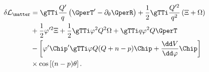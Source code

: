 \begin{equation}
\begin{aligned}
\delta \mathcal{L}_\matter & = \gTTi \frac{Q'}{q} \left(\GperT' -
\partial_\theta \GperR \right) + \frac{1}{2} \gTTi \frac{Q'^2}{q^2}
\left(\Xi + \Omega \right) \\ & + \frac{1}{2} \varphi'^2 \Xi +
\frac{1}{2} \gTTi \varphi^2 Q^2 \Omega + \gTTi q \varphi^2 Q \GperT \\
& - \left[ \varphi' \Chip' \gTTi \varphi Q(Q+n-p) \Chip + {\dd V\over
\dd \varphi} \Chip \right] \\ & \times \cos\left[(n-p)\theta\right].
\end{aligned}
\end{equation}

